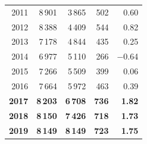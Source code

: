 \documentclass[]{interact}
\begin{document}
\begin{table}[H]
\begin{tabular}{@{}rrrrr@{}}
      2011 & 8\,901 & 3\,865 & 502 & \phantom{$-$}0.60 \\
      2012 & 8\,388 & 4\,409 & 544 & \phantom{$-$}0.82 \\
      2013 & 7\,178 & 4\,844 & 435 & \phantom{$-$}0.25 \\
      2014 & 6\,977 & 5\,110 & 266 & $-$0.64 \\
      2015 & 7\,266 & 5\,509 & 399 & \phantom{$-$}0.06 \\
      2016 & 7\,664 & 5\,972 & 463 & \phantom{$-$}0.39 \\
      \textbf{2017} & \textbf{8\,203} & \textbf{6\,708} & \textbf{736} & \textbf{\phantom{$-$}1.82} \\
      \textbf{2018} & \textbf{8\,150} & \textbf{7\,426} & \textbf{718} & \textbf{\phantom{$-$}1.73} \\
      \textbf{2019} & \textbf{8\,149} & \textbf{8\,149} & \textbf{723} & \textbf{\phantom{$-$}1.75} \\
\bottomrule
\end{tabular}
\end{table}
\end{document}

